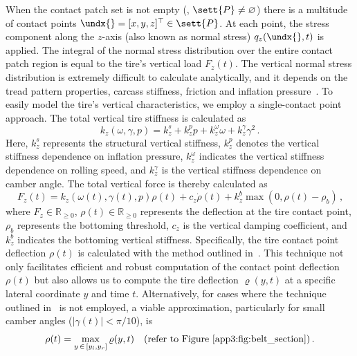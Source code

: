 When the contact patch set is not empty (\ie{}, $\sett{P} \neq \varnothing$) there is a multitude of contact points $\undx{} = [x,y,z]^\top \in \sett{P}$. At each point, the stress component along the $z$-axis (also known as normal stress) $q_z(\undx{},t)$ is applied. The integral of the normal stress distribution over the entire contact patch region is equal to the tire's vertical load $F_z(t)$. The vertical normal stress distribution is extremely difficult to calculate analytically, and it depends on the tread pattern properties, carcass stiffness, friction and inflation pressure~\cite{nakajima2019advanced}. To easily model the tire's vertical characteristics, we employ a single-contact point approach. The total vertical tire stiffness is calculated as
%
\begin{equation*}
  k_z(\omega, \gamma, p) = k_z^s + k_z^p p + k_z^\omega \omega + k_z^\gamma \gamma^2 \, \text{.}
\end{equation*}
%
Here, $k_z^s$ represents the structural vertical stiffness, $k_z^p$ denotes the vertical stiffness dependence on inflation pressure, $k_z^\omega$ indicates the vertical stiffness dependence on rolling speed, and $k_z^\gamma$ is the vertical stiffness dependence on camber angle. The total vertical force is thereby calculated as
%
\begin{equation}
  F_z(t) = k_z(\omega(t), \gamma(t), p) \rho(t) + c_z \dot{\rho}(t) + k_z^b \max(0, \rho(t)-\rho_b) \, \text{,}
  \label{app3:eq:vertical_force}
\end{equation}
%
where $F_z \in \mathbb{R}_{\geq 0}$, $\rho(t) \in \mathbb{R}_{\geq 0}$ represents the deflection at the tire contact point, $\rho_b$ represents the bottoming threshold, $c_z$ is the vertical damping coefficient, and $k_z^b$ indicates the bottoming vertical stiffness. Specifically, the tire contact point deflection $\rho(t)$ is calculated with the method outlined in~\cite{stocco2024novel, stocco2021acme}. This technique not only facilitates efficient and robust computation of the contact point deflection $\rho(t)$ but also allows us to compute the tire deflection $\varrho(y,t)$ at a specific lateral coordinate $y$ and time $t$. Alternatively, for cases where the technique outlined in~\cite{stocco2024novel} is not employed, a viable approximation, particularly for small camber angles ($|\gamma(t)| < \pi/10$), is
%
\begin{equation*}
  \rho(t) = \max_{y \, \in \, [y_l, y_r]} \varrho(y,t) \quad \text{(refer to \figurename~\ref{app3:fig:belt_section})} \, \text{.}
\end{equation*}

